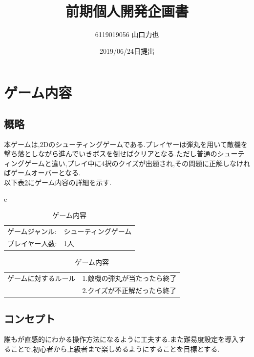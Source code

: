 \documentclass{jarticle}
\title{前期個人開発企画書}
\author{6119019056 山口力也}
\date{2019/06/24日提出}
\begin{document}
\maketitle
\section{ゲーム内容}
\subsection{概略}
本ゲームは,2Dのシューティングゲームである.プレイヤーは弾丸を用いて敵機を撃ち落としながら進んでいきボスを倒せばクリアとなる.ただし普通のシューティングゲームと違い,プレイ中に4択のクイズが出題され,その問題に正解しなければゲームオーバーとなる. \\
以下表\ref{table:gamenaiyou}にゲーム内容の詳細を示す.
\begin{table}[H]
\caption{ゲーム内容}
		\begin{tabular}{c}
		\label{table:gamenaiyou}
			\begin{minipage}{0.5\hsize}
				\begin{center}
					\begin{tabular}{|p{2.4cm}p{2.4cm}|} \hline
					ゲームジャンル: & シューティングゲーム \\
					プレイヤー人数: & 1人 \\ \hline
					\end{tabular}
				\end{center}
			\end{minipage}
			\begin{minipage}{0.5\hsize}
				\begin{center}
					\begin{tabular}{|p{2.4cm}p{2.4cm}|} \hline
					ゲームに対するルール & 1.敵機の弾丸が当たったら終了 \\ 
												& 2.クイズが不正解だったら終了 \\ \hline
					\end{tabular}
				\end{center}
			\end{minipage}
		\end{tabular}
\end{table}

\subsection{コンセプト}
誰もが直感的にわかる操作方法になるように工夫する.また難易度設定を導入することで,初心者から上級者まで楽しめるようにすることを目標とする.
\end{document}
